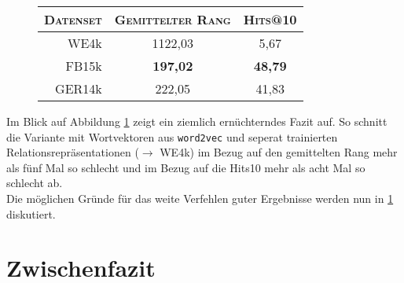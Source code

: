 \begin{figure}[h]
  \centering
  \begin{tabular}{r||c|c}
    \textsc{Datenset} & \textsc{Gemittelter Rang} & \textsc{Hits@10} \\
     \hline
     WE4k & 1122,03 & 5,67 \\
     FB15k & \textbf{197,02} & \textbf{48,79} \\
     GER14k & 222,05 & 41,83 \\
  \end{tabular}
  \caption[Resultate auf mit Wordvektoren auf \textsc{WE3k}]{\label{fig:eval-we4k}}
\end{figure}

Im Blick auf Abbildung \ref{fig:eval-we4k} zeigt ein ziemlich ernüchterndes Fazit auf. So schnitt die Variante
mit Wortvektoren aus \verb|word2vec| und seperat trainierten Relationsrepräsentationen ($\rightarrow$ WE4k) im Bezug auf
den gemittelten Rang mehr als fünf Mal so schlecht und im Bezug auf die Hits\@10 mehr als acht Mal so schlecht ab.\\
Die möglichen Gründe für das weite Verfehlen guter Ergebnisse werden nun in \ref{sec:we4k-zwifa} diskutiert.

\section{Zwischenfazit}\label{sec:we4k-zwifa}

